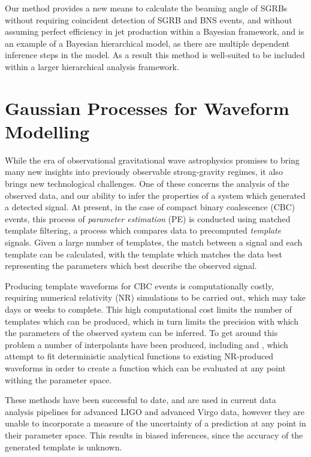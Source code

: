 \documentclass[openleft]{kentigern}
\theoremstyle{definition}
\begin{document}
Our method provides a new means to calculate the beaming angle of
SGRBs without requiring coincident detection of SGRB and BNS events,
and without assuming perfect efficiency in jet production within a
Bayesian framework, and is an example of a Bayesian hierarchical
model, as there are multiple dependent inference steps in the
model. As a result this method is well-suited to be included within a
larger hierarchical analysis framework.


\section{Gaussian Processes for Waveform Modelling}

While the era of observational gravitational wave astrophysics
promises to bring many new insights into previously observable
strong-gravity regimes, it also brings new technological
challenges. One of these concerns the analysis of the observed data,
and our ability to infer the properties of a system which generated a
detected signal. At present, in the case of compact binary coalescence
(CBC) events, this process of \emph{parameter estimation} (PE) is
conducted using matched template filtering, a process which compares
data to precomputed \emph{template} signals. Given a large number of
templates, the match between a signal and each template can be
calculated, with the template which matches the data best representing
the parameters which best describe the observed signal.

Producing template waveforms for CBC events is computationally costly,
requiring numerical relativity (NR) simulations to be carried out,
which may take days or weeks to complete. This high computational cost
limits the number of templates which can be produced, which in turn
limits the precision with which the parameters of the observed system
can be inferred. To get around this problem a number of interpolants
have been produced, including \imrp{} and \seobnr{}, which attempt to
fit deterministic analytical functions to existing NR-produced
waveforms in order to create a function which can be evaluated at any
point withing the parameter space.

These methods have been successful to date, and are used in current
data analysis pipelines for advanced LIGO and advanced Virgo data,
however they are unable to incorporate a measure of the uncertainty of
a prediction at any point in their parameter space. This results in
biased inferences, since the accuracy of the generated template is
unknown.
\end{document}

